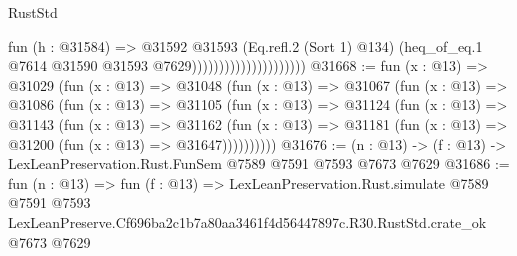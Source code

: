 \begin{lexlean}{RustStd}
\begin{coremodule}
                                          fun (h : @31584) =>
                                          @31592
                                            @31593
                                            (Eq.refl.{2} (Sort 1) @134)
                                            (heq_of_eq.{1}
                                              @7614
                                              @31590
                                              @31593
                                              @7629)))))))))))))))))))))
@31668 := fun (x : @13) =>
  @31029
    (fun (x : @13) =>
    @31048
      (fun (x : @13) =>
      @31067
        (fun (x : @13) =>
        @31086
          (fun (x : @13) =>
          @31105
            (fun (x : @13) =>
            @31124
              (fun (x : @13) =>
              @31143
                (fun (x : @13) =>
                @31162
                  (fun (x : @13) =>
                  @31181 (fun (x : @13) => @31200 (fun (x : @13) => @31647))))))))))
@31676 := (n : @13) -> (f : @13) -> LexLeanPreservation.Rust.FunSem @7589 @7591 @7593 @7673 @7629
@31686 := fun (n : @13) =>
  fun (f : @13) =>
  LexLeanPreservation.Rust.simulate
    @7589
    @7591
    @7593
    LexLeanPreserve.Cf696ba2c1b7a80aa3461f4d56447897c.R30.RustStd.crate_ok
    @7673
    @7629
\end{coremodule}
\end{lexlean}
